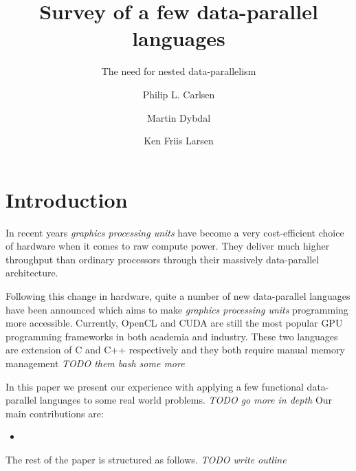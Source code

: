 \documentclass{llncs2e/llncs}
\title{Survey of a few data-parallel languages}
\subtitle{The need for nested data-parallelism} \author{Philip L. Carlsen \and Martin Dybdal \and Ken Friis Larsen}
\institute{University of Copenhagen \\ \email{plcplc@gmail.com,
    dybber@dybber.dk, kflarsen@diku.dk}}
\begin{document}
\maketitle

\section{Introduction}
In recent years \emph{graphics processing units} have become a very
cost-efficient choice of hardware when it comes to raw compute
power. They deliver much higher throughput than ordinary processors
through their massively data-parallel architecture.

Following this change in hardware, quite a number of new data-parallel
languages \cite{} have been announced which aims to make
\emph{graphics processing units} programming more
accessible. Currently, OpenCL and CUDA are still the most popular GPU
programming frameworks in both academia and industry. These two
languages are extension of C and C++ respectively and they both
require manual memory management \emph{TODO them bash some more}

In this paper we present our experience with applying a few functional
data-parallel languages to some real world problems. \emph{TODO go
  more in depth} Our main contributions are:
\begin{itemize}
\item 
\end{itemize}

The rest of the paper is structured as follows. \emph{TODO write outline}

\end{document}
